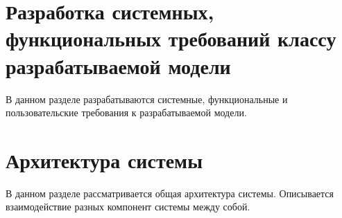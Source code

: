 





\section{Разработка системных, функциональных требований классу разрабатываемой модели}
\begin{annotation}
	В данном разделе разрабатываются системные, функциональные и пользовательские требования к
	разрабатываемой модели.
\end{annotation}




\section{Архитектура системы}
\begin{annotation}
	В данном разделе рассматривается общая архитектура системы.
	Описывается взаимодействие разных компонент системы между собой.
\end{annotation}


